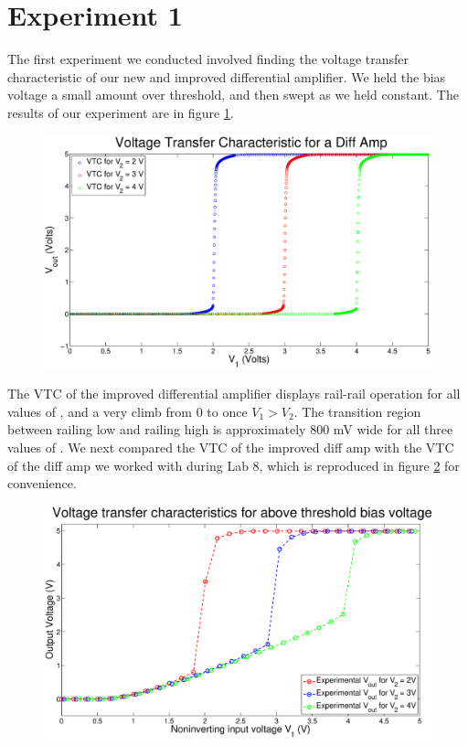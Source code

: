 \section*{Experiment 1}

The first experiment we conducted involved finding the voltage transfer characteristic of our new and improved differential amplifier. We held the bias voltage a small amount over threshold, and then swept \Vone as we held \Vtwo constant. The results of our experiment are in figure \ref{fig:exp1p1}.

\begin{figure}[H]
\centering
\includegraphics[width=\linewidth]{../Figures/Exp1.eps}
\caption{}
\label{fig:exp1p1}
\end{figure}
The VTC of the improved differential amplifier displays rail-rail operation for all values of \Vone, and a very climb from 0 to \Vdd once $V_1 > V_2$. The transition region between railing low and railing high is approximately 800 mV wide for all three values of \Vtwo. We next compared the VTC of the improved diff amp with the VTC of the diff amp we worked with during Lab 8, which is reproduced in figure \ref{fig:oldvtc} for convenience.
\begin{figure}[H]
\centering
\includegraphics[width=\linewidth]{../Figures/OldVTC.eps}
\caption{}
\label{fig:oldvtc}
\end{figure}

